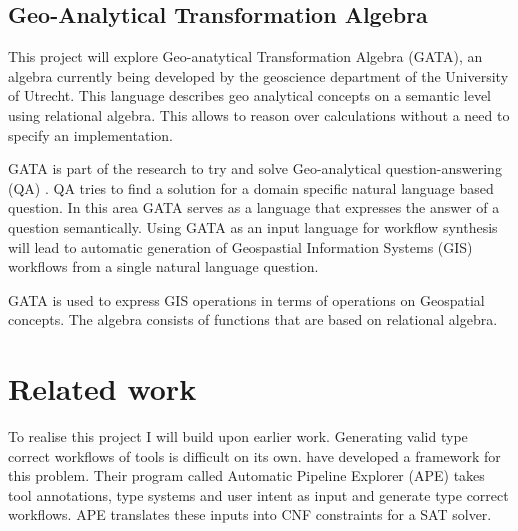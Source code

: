 \documentclass{article}
\begin{document}
\subsection{Geo-Analytical Transformation Algebra}
This project will explore Geo-anatytical Transformation Algebra (GATA), an algebra currently being developed by the geoscience department of the University of Utrecht.
This language describes geo analytical concepts on a semantic level using relational algebra. This allows to reason over calculations without a need to specify an implementation. 

GATA is part of the research to try and solve Geo-analytical question-answering (QA) \cite{scheider2020geo}. QA tries to find a solution for a domain specific natural language based question. In this area GATA serves as a language that expresses the answer of a question semantically. Using GATA as an input language for workflow synthesis will lead to automatic generation of Geospastial Information Systems (GIS) workflows from a single natural language question.

GATA is used to express GIS operations in terms of operations on Geospatial concepts. The algebra consists of functions that are based on relational algebra.  


\section{Related work }
To realise this project I will build upon earlier work. Generating valid type correct workflows of tools is difficult on its own. \cite{kasalica2020semantic} have developed a framework for this problem. Their program called Automatic Pipeline Explorer (APE) takes tool annotations, type systems and user intent as input and generate type correct workflows. APE translates these inputs into CNF constraints for a SAT solver. 
\end{document}
